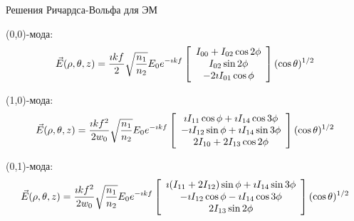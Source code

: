 \documentclass[9pt, compress, xcolor=table]{beamer}
\begin{document}
\begin{frame}{Решения Ричардса-Вольфа для ЭМ}

(0,0)-мода:\begin{equation*}
\begin{gathered}
\vec E(\rho, \theta, z) = \frac{\imath k f}{2} \sqrt {\frac{n_1}{n_2}}E_0 e^{-\imath k f}
\left[\array{c} I_{00} + I_{02}\cos 2 \phi \\ I_{02} \sin 2 \phi \\ -2 \imath I_{01}\cos \phi
\endarray\right] (\cos \theta)^{1/2}
\end{gathered}
\end{equation*}


(1,0)-мода:\begin{equation*}
\begin{gathered}
\vec E(\rho, \theta, z) = \frac{\imath k f^2}{2w_0} \sqrt {\frac{n_1}{n_2}}E_0 e^{-\imath k f}
\left[\array{c} \imath I_{11} \cos \phi + \imath I_{14}\cos 3 \phi \\ - \imath I_{12} \sin \phi +
\imath I_{14}\sin 3\phi
 \\ 2 I_{10} + 2 I_{13}\cos 2 \phi \endarray\right]
(\cos \theta)^{1/2}
\end{gathered}
\end{equation*}

(0,1)-мода:\begin{equation*}
\begin{gathered}
\vec E(\rho, \theta, z) = \frac{\imath k f^2}{2w_0} \sqrt {\frac{n_1}{n_2}}E_0 e^{-\imath k f}
\left[\array{c} \imath (I_{11} + 2I_{12}) \sin \phi + \imath I_{14}\sin 3 \phi \\ - \imath I_{12}
\cos \phi - \imath I_{14}\cos 3\phi
 \\ 2 I_{13}\sin 2 \phi \endarray\right]
(\cos \theta)^{1/2}
\end{gathered}
\end{equation*}

\end{frame}
\end{document}

